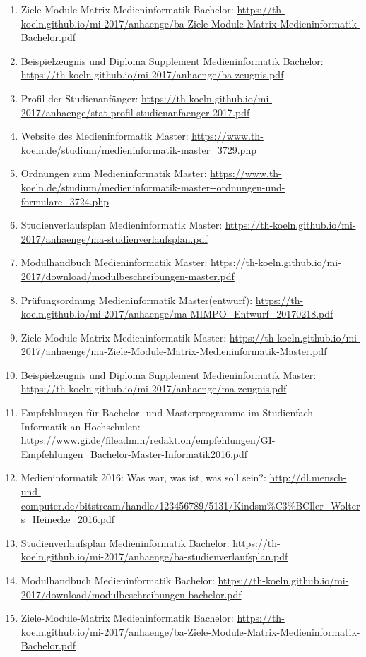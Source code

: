 \documentclass[BCOR12mm,DIV11,titlepage,a4paper,oneside,10pt]{scrbook}
\begin{document}
\begin{sloppypar}
\begin{flushleft}
\begin{enumerate}
\item{Ziele-Module-Matrix Medieninformatik Bachelor: \url{https://th-koeln.github.io/mi-2017/anhaenge/ba-Ziele-Module-Matrix-Medieninformatik-Bachelor.pdf} } 
\item{Beispielzeugnis und Diploma Supplement Medieninformatik Bachelor: \url{https://th-koeln.github.io/mi-2017/anhaenge/ba-zeugnis.pdf} } 
\item{Profil der Studienanfänger: \url{https://th-koeln.github.io/mi-2017/anhaenge/stat-profil-studienanfaenger-2017.pdf} } 
\item{Website des Medieninformatik Master: \url{https://www.th-koeln.de/studium/medieninformatik-master\_3729.php} } 
\item{Ordnungen zum Medieninformatik Master: \url{https://www.th-koeln.de/studium/medieninformatik-master--ordnungen-und-formulare\_3724.php} } 
\item{Studienverlaufsplan Medieninformatik Master: \url{https://th-koeln.github.io/mi-2017/anhaenge/ma-studienverlaufsplan.pdf} } 
\item{Modulhandbuch Medieninformatik Master: \url{https://th-koeln.github.io/mi-2017/download/modulbeschreibungen-master.pdf} } 
\item{Prüfungsordnung Medieninformatik Master(entwurf): \url{https://th-koeln.github.io/mi-2017/anhaenge/ma-MIMPO\_Entwurf\_20170218.pdf} } 
\item{Ziele-Module-Matrix Medieninformatik Master: \url{https://th-koeln.github.io/mi-2017/anhaenge/ma-Ziele-Module-Matrix-Medieninformatik-Master.pdf} } 
\item{Beispielzeugnis und Diploma Supplement Medieninformatik Master: \url{https://th-koeln.github.io/mi-2017/anhaenge/ma-zeugnis.pdf} } 
\item{Empfehlungen für Bachelor- und Masterprogramme im Studienfach Informatik an Hochschulen: \url{https://www.gi.de/fileadmin/redaktion/empfehlungen/GI-Empfehlungen\_Bachelor-Master-Informatik2016.pdf} } 
\item{Medieninformatik 2016: Was war, was ist, was soll sein?: \url{http://dl.mensch-und-computer.de/bitstream/handle/123456789/5131/Kindsm\%C3\%BCller\_Wolters\_Heinecke\_2016.pdf} } 
\item{Studienverlaufsplan Medieninformatik Bachelor: \url{https://th-koeln.github.io/mi-2017/anhaenge/ba-studienverlaufsplan.pdf} } 
\item{Modulhandbuch Medieninformatik Bachelor: \url{https://th-koeln.github.io/mi-2017/download/modulbeschreibungen-bachelor.pdf} } 
\item{Ziele-Module-Matrix Medieninformatik Bachelor: \url{https://th-koeln.github.io/mi-2017/anhaenge/ba-Ziele-Module-Matrix-Medieninformatik-Bachelor.pdf} } 

\end{enumerate}
\end{flushleft}
\end{sloppypar}
\end{document}
